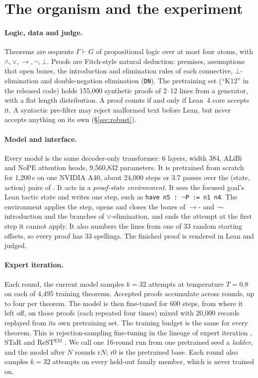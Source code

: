 \section{The organism and the experiment}
\label{sec:setup}

\paragraph{Logic, data and judge.} Theorems are sequents $\Gamma \vdash G$ of propositional logic over at most four
atoms, with $\land,\lor,\to,\neg,\bot$. Proofs are Fitch-style natural deduction: premises, assumptions that open boxes,
the introduction and elimination rules of each connective, $\bot$-elimination and double-negation elimination
(\texttt{DN}). The pretraining set \KT{} (``K12'' in the released code) holds 155,000 synthetic proofs of 2--12 lines from a
generator, with a flat length distribution. A proof counts if and only if Lean~4 core accepts it. A syntactic pre-filter may reject
malformed text before Lean, but never accepts anything on its own (\S\ref{sec:robust}).

\paragraph{Model and interface.} Every model is the same decoder-only transformer: 6 layers, width 384, ALiBi and NoPE
attention heads, 9,560,832 parameters. It is pretrained from scratch for 1,200\,s on one NVIDIA A40, about 24,000 steps
or 3.7 passes over the (state, action) pairs of \KT{}. It acts in a \emph{proof-state environment}. It sees the focused
goal's Lean tactic state and writes one step, such as \texttt{have n5 : $\neg$P := n1 n4}. The environment applies the
step, opens and closes the boxes of $\to$- and $\neg$-introduction and the branches of $\lor$-elimination, and ends the
attempt at the first step it cannot apply. It also numbers the lines from one of 33 random starting offsets, so every
proof has 33 spellings. The finished proof is rendered in Lean and judged.

\paragraph{Expert iteration.} Each round, the current model samples $k=32$ attempts at temperature $T=0.8$ on each of
4,495 training theorems. Accepted proofs accumulate across rounds, up to four per theorem. The model is then fine-tuned
for 600 steps, from where it left off, on those proofs (each repeated four times) mixed with 20,000 records replayed
from its own pretraining set. The training budget is the same for every theorem. This is rejection-sampling fine-tuning
in the lineage of expert iteration \citep{anthony2017exit,polu2022curriculum}, STaR \citep{zelikman2022star} and
ReST$^{\mathrm{EM}}$ \citep{singh2023restem}. We call one 16-round run from one pretrained seed a \emph{ladder}, and
the model after $N$ rounds r$N$; r0 is the pretrained base. Each round also samples $k=32$ attempts on every held-out
family member, which is never trained on.

